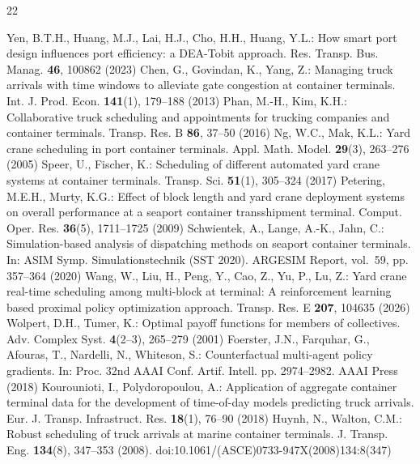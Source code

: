 \documentclass[a4paper]{llncs}
\begin{document}
\small
\begin{thebibliography}{22}
\raggedright
\setlength{\itemsep}{0pt}
\setlength{\parsep}{0pt}
\setlength{\topsep}{2pt}
 Yen, B.T.H., Huang, M.J., Lai, H.J., Cho, H.H., Huang, Y.L.: How smart port design influences port efficiency: a DEA-Tobit approach. Res. Transp. Bus. Manag. \textbf{46}, 100862 (2023)
 Chen, G., Govindan, K., Yang, Z.: Managing truck arrivals with time windows to alleviate gate congestion at container terminals. Int. J. Prod. Econ. \textbf{141}(1), 179--188 (2013)
 Phan, M.-H., Kim, K.H.: Collaborative truck scheduling and appointments for trucking companies and container terminals. Transp. Res. B \textbf{86}, 37--50 (2016)
 Ng, W.C., Mak, K.L.: Yard crane scheduling in port container terminals. Appl. Math. Model. \textbf{29}(3), 263--276 (2005)
 Speer, U., Fischer, K.: Scheduling of different automated yard crane systems at container terminals. Transp. Sci. \textbf{51}(1), 305--324 (2017)
 Petering, M.E.H., Murty, K.G.: Effect of block length and yard crane deployment systems on overall performance at a seaport container transshipment terminal. Comput. Oper. Res. \textbf{36}(5), 1711--1725 (2009)
 Schwientek, A., Lange, A.-K., Jahn, C.: Simulation-based analysis of dispatching methods on seaport container terminals. In: ASIM Symp. Simulationstechnik (SST 2020). ARGESIM Report, vol.~59, pp. 357--364 (2020)
 Wang, W., Liu, H., Peng, Y., Cao, Z., Yu, P., Lu, Z.: Yard crane real-time scheduling among multi-block at terminal: A reinforcement learning based proximal policy optimization approach. Transp. Res. E \textbf{207}, 104635 (2026)
 Wolpert, D.H., Tumer, K.: Optimal payoff functions for members of collectives. Adv. Complex Syst. \textbf{4}(2--3), 265--279 (2001)
 Foerster, J.N., Farquhar, G., Afouras, T., Nardelli, N., Whiteson, S.: Counterfactual multi-agent policy gradients. In: Proc. 32nd AAAI Conf. Artif. Intell. pp. 2974--2982. AAAI Press (2018)
 Kourounioti, I., Polydoropoulou, A.: Application of aggregate container terminal data for the development of time-of-day models predicting truck arrivals. Eur. J. Transp. Infrastruct. Res. \textbf{18}(1), 76--90 (2018)
 Huynh, N., Walton, C.M.: Robust scheduling of truck arrivals at marine container terminals. J. Transp. Eng. \textbf{134}(8), 347--353 (2008). doi:10.1061/(ASCE)0733-947X(2008)134:8(347)

\end{thebibliography}
\end{document}
